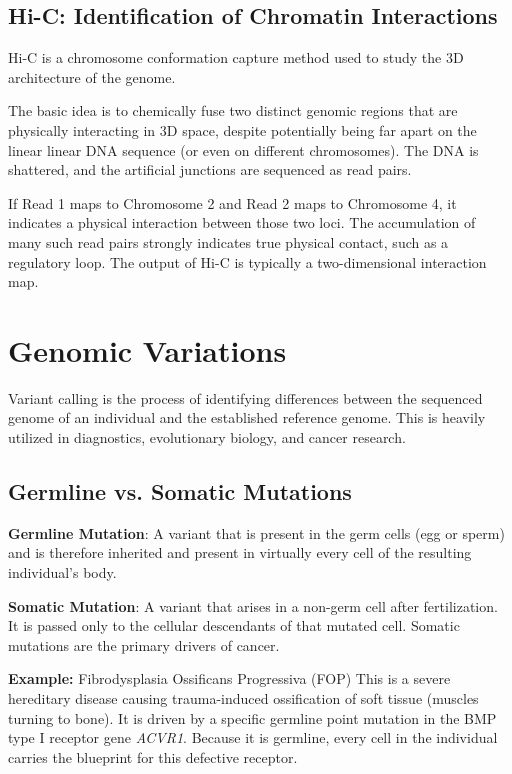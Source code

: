 \subsection{Hi-C: Identification of Chromatin Interactions}

Hi-C is a chromosome conformation capture method used to study the 3D architecture of the genome. 

The basic idea is to chemically fuse two distinct genomic regions that are physically interacting in 3D space, despite potentially being far apart on the linear linear DNA sequence (or even on different chromosomes). The DNA is shattered, and the artificial junctions are sequenced as read pairs. 

If Read 1 maps to Chromosome 2 and Read 2 maps to Chromosome 4, it indicates a physical interaction between those two loci. The accumulation of many such read pairs strongly indicates true physical contact, such as a regulatory loop. The output of Hi-C is typically a two-dimensional interaction map.

\section{Genomic Variations}

Variant calling is the process of identifying differences between the sequenced genome of an individual and the established reference genome. This is heavily utilized in diagnostics, evolutionary biology, and cancer research.

\subsection{Germline vs. Somatic Mutations}

\begin{important}
  \textbf{Germline Mutation}: A variant that is present in the germ cells (egg or sperm) and is therefore inherited and present in virtually every cell of the resulting individual's body. 
\end{important}

\begin{important}
  \textbf{Somatic Mutation}: A variant that arises in a non-germ cell after fertilization. It is passed only to the cellular descendants of that mutated cell. Somatic mutations are the primary drivers of cancer.
\end{important}

\textbf{Example:} Fibrodysplasia Ossificans Progressiva (FOP)
This is a severe hereditary disease causing trauma-induced ossification of soft tissue (muscles turning to bone). It is driven by a specific germline point mutation in the BMP type I receptor gene \textit{ACVR1}. Because it is germline, every cell in the individual carries the blueprint for this defective receptor.

